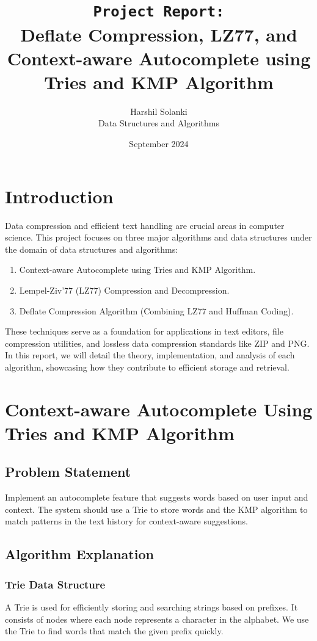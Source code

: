 \documentclass[10pt,a4paper]{report}
\title{\texttt{Project Report:}\\ Deflate Compression, LZ77, and Context-aware Autocomplete using Tries and KMP Algorithm}
\author{Harshil Solanki\\
        Data Structures and Algorithms}
\date{September 2024}
\begin{document}
\maketitle

\tableofcontents

\chapter{Introduction}
Data compression and efficient text handling are crucial areas in computer science. This project focuses on three major algorithms and data structures under the domain of data structures and algorithms:
\begin{enumerate}
    \item Context-aware Autocomplete using Tries and KMP Algorithm.
    \item Lempel-Ziv'77 (LZ77) Compression and Decompression.
    \item Deflate Compression Algorithm (Combining LZ77 and Huffman Coding).
\end{enumerate}

These techniques serve as a foundation for applications in text editors, file compression utilities, and lossless data compression standards like ZIP and PNG. In this report, we will detail the theory, implementation, and analysis of each algorithm, showcasing how they contribute to efficient storage and retrieval.

\chapter{Context-aware Autocomplete Using Tries and KMP Algorithm}
\section{Problem Statement}
Implement an autocomplete feature that suggests words based on user input and context. The system should use a Trie to store words and the KMP algorithm to match patterns in the text history for context-aware suggestions.

\section{Algorithm Explanation}
\subsection{Trie Data Structure}
A Trie is used for efficiently storing and searching strings based on prefixes. It consists of nodes where each node represents a character in the alphabet. We use the Trie to find words that match the given prefix quickly.
\end{document}
